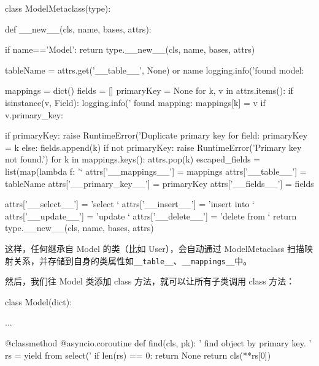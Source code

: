 \begin{pythoncode}
class ModelMetaclass(type):

    def __new__(cls, name, bases, attrs):
        
        if name=='Model':
            return type.__new__(cls, name, bases, attrs)
        
        tableName = attrs.get('__table__', None) or name
        logging.info('found model: %
        
        mappings = dict()
        fields = []
        primaryKey = None
        for k, v in attrs.items():
            if isinstance(v, Field):
                logging.info('  found mapping: %
                mappings[k] = v
                if v.primary_key:
                    
                    if primaryKey:
                        raise RuntimeError('Duplicate primary key for field: %
                    primaryKey = k
                else:
                    fields.append(k)
        if not primaryKey:
            raise RuntimeError('Primary key not found.')
        for k in mappings.keys():
            attrs.pop(k)
        escaped_fields = list(map(lambda f: '`%
        attrs['__mappings__'] = mappings 
        attrs['__table__'] = tableName
        attrs['__primary_key__'] = primaryKey 
        attrs['__fields__'] = fields 
        
        attrs['__select__'] = 'select `%
        attrs['__insert__'] = 'insert into `%
        attrs['__update__'] = 'update `%
        attrs['__delete__'] = 'delete from `%
        return type.__new__(cls, name, bases, attrs)
\end{pythoncode}

这样，任何继承自 Model 的类（比如 User），会自动通过 ModelMetaclass
扫描映射关系，并存储到自身的类属性如\texttt{\_\_table\_\_}、\texttt{\_\_mappings\_\_}中。

然后，我们往 Model 类添加 class 方法，就可以让所有子类调用 class 方法：

\begin{pythoncode}
class Model(dict):

    ...

    @classmethod
    @asyncio.coroutine
    def find(cls, pk):
        ' find object by primary key. '
        rs = yield from select('%
        if len(rs) == 0:
            return None
        return cls(**rs[0])
\end{pythoncode}


